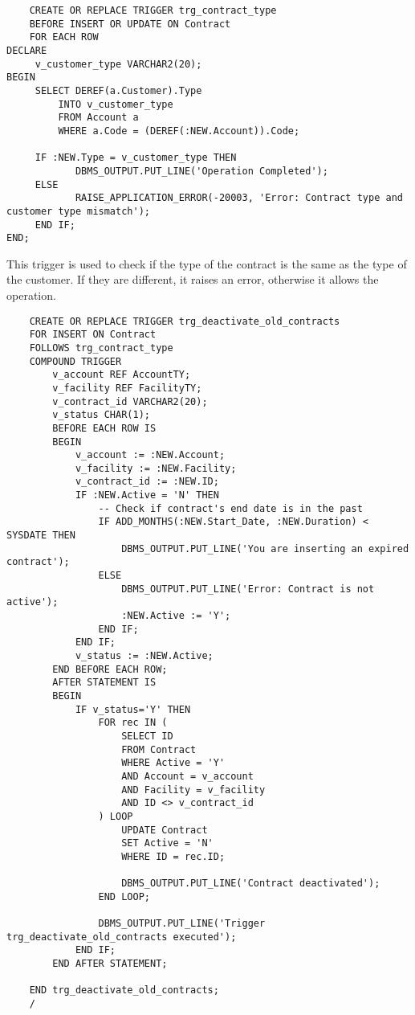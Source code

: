 \begin{lstlisting}
    CREATE OR REPLACE TRIGGER trg_contract_type
    BEFORE INSERT OR UPDATE ON Contract
    FOR EACH ROW
DECLARE
     v_customer_type VARCHAR2(20);
BEGIN
     SELECT DEREF(a.Customer).Type
         INTO v_customer_type
         FROM Account a
         WHERE a.Code = (DEREF(:NEW.Account)).Code;

     IF :NEW.Type = v_customer_type THEN
            DBMS_OUTPUT.PUT_LINE('Operation Completed');
     ELSE
            RAISE_APPLICATION_ERROR(-20003, 'Error: Contract type and customer type mismatch');
     END IF;
END;
\end{lstlisting}

This trigger is used to check if the type of the contract is the same as the type of the customer. If they are different, it raises an error, otherwise it allows the operation.


\begin{lstlisting}
    CREATE OR REPLACE TRIGGER trg_deactivate_old_contracts
    FOR INSERT ON Contract
    FOLLOWS trg_contract_type
    COMPOUND TRIGGER
        v_account REF AccountTY;
        v_facility REF FacilityTY;
        v_contract_id VARCHAR2(20); 
        v_status CHAR(1);
        BEFORE EACH ROW IS
        BEGIN
            v_account := :NEW.Account;
            v_facility := :NEW.Facility;
            v_contract_id := :NEW.ID;
            IF :NEW.Active = 'N' THEN
                -- Check if contract's end date is in the past
                IF ADD_MONTHS(:NEW.Start_Date, :NEW.Duration) < SYSDATE THEN
                    DBMS_OUTPUT.PUT_LINE('You are inserting an expired contract');
                ELSE
                    DBMS_OUTPUT.PUT_LINE('Error: Contract is not active');
                    :NEW.Active := 'Y';
                END IF;
            END IF;
            v_status := :NEW.Active;
        END BEFORE EACH ROW;
        AFTER STATEMENT IS
        BEGIN
            IF v_status='Y' THEN
                FOR rec IN (
                    SELECT ID
                    FROM Contract
                    WHERE Active = 'Y'
                    AND Account = v_account
                    AND Facility = v_facility
                    AND ID <> v_contract_id
                ) LOOP
                    UPDATE Contract
                    SET Active = 'N'
                    WHERE ID = rec.ID;
    
                    DBMS_OUTPUT.PUT_LINE('Contract deactivated');
                END LOOP;
    
                DBMS_OUTPUT.PUT_LINE('Trigger trg_deactivate_old_contracts executed');
            END IF;
        END AFTER STATEMENT;
    
    END trg_deactivate_old_contracts;
    /
\end{lstlisting}

